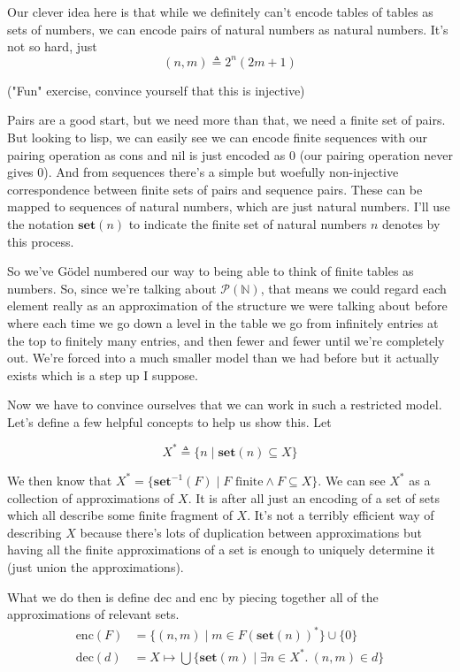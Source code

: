 \documentclass{amsart}
\newcommand{\set}[1]{\ensuremath{\mathbf{set}(#1)}}
\newcommand{\unset}[1]{\ensuremath{\mathbf{set}^{-1}(#1)}}
\newcommand{\enc}{\text{enc}}
\newcommand{\dec}{\text{dec}}
\begin{document}
Our clever idea here is that while we definitely can't encode tables
of tables as sets of numbers, we can encode pairs of natural numbers
as natural numbers. It's not so hard, just
\[
  (n, m) \triangleq 2^n(2m + 1)
\]

("Fun" exercise, convince yourself that this is injective)

Pairs are a good start, but we need more than that, we need a finite
set of pairs. But looking to lisp, we can easily see we can encode
finite sequences with our pairing operation as cons and nil is just
encoded as 0 (our pairing operation never gives 0). And from sequences
there's a simple but woefully non-injective correspondence between
finite sets of pairs and sequence pairs. These can be mapped to
sequences of natural numbers, which are just natural numbers. I'll
use the notation \set{n} to indicate the finite set of natural numbers
$n$ denotes by this process.

So we've G\"odel numbered our way to being able to think of finite
tables as numbers. So, since we're talking about
$\mathcal{P}(\mathbb{N})$, that means we could regard each element
really as an approximation of the structure we were talking about
before where each time we go down a level in the table we go from
infinitely entries at the top to finitely many entries, and then fewer
and fewer until we're completely out. We're forced into a much smaller
model than we had before but it actually exists which is a step up I
suppose.

Now we have to convince ourselves that we can work in such a
restricted model. Let's define a few helpful concepts to help us show
this. Let

\[
  X^* \triangleq \{n \mid \set{n} \subseteq X\}
\]

We then know that
$X^* = \{\unset{F} \mid F \text{ finite} \wedge F \subseteq X\}$. We
can see $X^*$ as a collection of approximations of $X$. It is after
all just an encoding of a set of sets which all describe some finite
fragment of $X$. It's not a terribly efficient way of describing $X$
because there's lots of duplication between approximations but having
all the finite approximations of a set is enough to uniquely determine
it (just union the approximations).

What we do then is define $\dec$ and $\enc$ by piecing together all of
the approximations of relevant sets.
\begin{align*}
  \enc(F) &= \{(n, m) \mid m \in F(\set{n})^*\} \cup \{0\}\\
  \dec(d) &= X \mapsto
    \bigcup \{\set{m} \mid \exists n \in X^*.\ (n, m) \in d\}
\end{align*}
\end{document}
